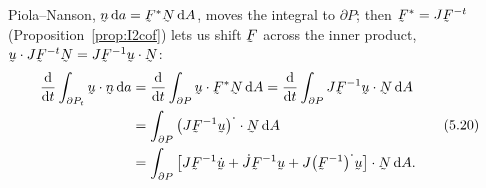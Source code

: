 Piola--Nanson, $\bn\,\dl a=\bF^{*}\bN\,\dl A$, moves the integral to
$\partial P$; then $\bF^{*}=J\bF^{-t}$ (Proposition~\ref{prop:I2cof})
lets us shift $\bF$ across the inner product,
$\ip\bu{J\bF^{-t}\bN}=J\ip{\bF^{-1}\bu}\bN$:
\begin{equation}
\begin{aligned}
   \frac{\dl}{\dl t}\int_{\partial P_{t}}\ip\bu\bn\,\dl a
   &=\frac{\dl}{\dl t}\int_{\partial P}\ip\bu{\bF^{*}\bN}\,\dl A
    =\frac{\dl}{\dl t}\int_{\partial P}\ip{J\bF^{-1}\bu}\bN\,\dl A\\
   &=\int_{\partial P}\ip{\big(J\bF^{-1}\bu\big)^{\textstyle\cdot}}\bN\,\dl A\\
   &=\int_{\partial P}\ip{\big[J\bF^{-1}\dot\bu+\dot J\bF^{-1}\bu
     +J\big(\bF^{-1}\big)^{\textstyle\cdot}\bu\big]}\bN\,\dl A .
\end{aligned}
   \tag{5.20}\label{eq:5.20}
\end{equation}

